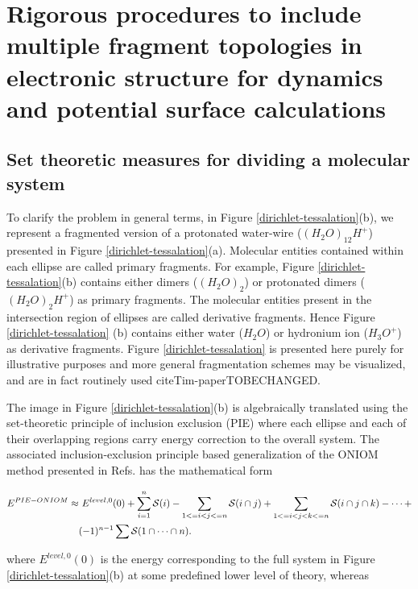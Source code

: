 \chapter{Rigorous procedures to include multiple fragment topologies in
electronic structure for dynamics and potential surface calculations}

\section{Set theoretic measures for dividing a molecular system}

\label{dynafrag}
To clarify the problem in general terms, in Figure
\ref{dirichlet-tessalation}(b), we represent a fragmented version of
a protonated water-wire ($(H_{2}O)_{12}H^{+}$) presented in Figure
\ref{dirichlet-tessalation}(a). Molecular entities contained within each
ellipse are called primary fragments. For example, Figure
\ref{dirichlet-tessalation}(b) contains either dimers ($(H_{2}O)_{2}$)
or protonated dimers ($(H_{2}O)_{2}H^{+}$) as primary fragments. The
molecular entities present in the intersection region of ellipses
are called derivative fragments. Hence Figure \ref{dirichlet-tessalation} (b)
contains either water ($H_{2}O$) or hydronium ion ($H_{3}O^{+}$) as
derivative fragments. Figure \ref{dirichlet-tessalation} is presented
here purely for illustrative purposes and more general fragmentation
schemes may be visualized, and are in fact routinely used
cite{Tim-paper}TOBECHANGED.

The image in Figure \ref{dirichlet-tessalation}(b) is algebraically
translated using the set-theoretic principle of inclusion exclusion
(PIE)\cite{pie} where each ellipse and each of their overlapping
regions carry energy correction to the overall system. The associated
inclusion-exclusion principle based generalization of the ONIOM method
\cite{oniom} presented in Refs.\cite{fragAIMD,fragAIMD-elbo,fragAIMD-CC}
has the mathematical form

\begin{align}
E^{PIE-ONIOM} \approx & ~E^{level,0}(0) + \sum^n_{i=1}{\cal S}(i) - \sum_{1<=i<j<=n}{\cal S}(i\cap
j)+\sum_{1<=i<j<k<=n}{\cal S}(i\cap j\cap k)- \cdots + \nonumber \\ & (-1)^{n-1}\sum {\cal
  S}(1\cap \cdots \cap n).
\label{eq:pie-oniom}
\end{align}

\noindent where $E^{level,0}(0)$ is the energy corresponding to the full system
in Figure \ref{dirichlet-tessalation}(b) at some predefined lower level
of theory, whereas

